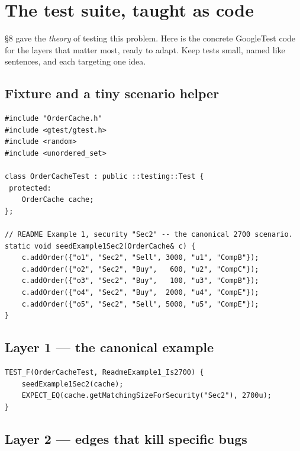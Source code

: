 \section{The test suite, taught as code}

\S8 gave the \emph{theory} of testing this problem. Here is the concrete GoogleTest
code for the layers that matter most, ready to adapt. Keep tests small, named like
sentences, and each targeting one idea.

\subsection{Fixture and a tiny scenario helper}

\begin{lstlisting}
#include "OrderCache.h"
#include <gtest/gtest.h>
#include <random>
#include <unordered_set>

class OrderCacheTest : public ::testing::Test {
 protected:
    OrderCache cache;
};

// README Example 1, security "Sec2" -- the canonical 2700 scenario.
static void seedExample1Sec2(OrderCache& c) {
    c.addOrder({"o1", "Sec2", "Sell", 3000, "u1", "CompB"});
    c.addOrder({"o2", "Sec2", "Buy",   600, "u2", "CompC"});
    c.addOrder({"o3", "Sec2", "Buy",   100, "u3", "CompB"});
    c.addOrder({"o4", "Sec2", "Buy",  2000, "u4", "CompE"});
    c.addOrder({"o5", "Sec2", "Sell", 5000, "u5", "CompE"});
}
\end{lstlisting}

\subsection{Layer 1 --- the canonical example}

\begin{lstlisting}
TEST_F(OrderCacheTest, ReadmeExample1_Is2700) {
    seedExample1Sec2(cache);
    EXPECT_EQ(cache.getMatchingSizeForSecurity("Sec2"), 2700u);
}
\end{lstlisting}

\subsection{Layer 2 --- edges that kill specific bugs}

